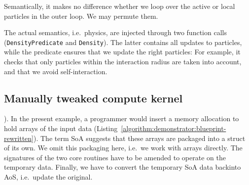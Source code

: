 Semantically, it makes no difference whether we loop over the active or local particles in the outer loop.
We may permute them.


The actual semantics, i.e.~physics, are injected through two function calls (\texttt{DensityPredicate} and \texttt{Density}).
The latter contains all updates to particles, while the predicate ensures that we update the right particles:
For example, it checks that only particles within the interaction radius are taken into account,
and that we avoid self-interaction.





\subsection{Manually tweaked compute kernel}



\cite{Gallard:2020:Roles,Gallard:2020:ExaHyPEVectorisation,Homann:2018:SoAx,Hundt:2006:StructureLayoutOptimisation,Intel:MemoryLayoutTransformations,Jubertie:2018:DataLayoutAbstractionLayers,Reinders:2016:XeonPhi,Springer:2018:SoALayout,Strzodka:2011:AbstractionSoA,Sung:2012:DataLayoutTransformations,Vikram:2014:LLVM,Xu:2014:SemiAutomaticComposition}).
In the present example, a programmer would insert a memory allocation to hold arrays of the input data (Listing~\ref{algorithm:demonstrator:blueprint-rewritten}).
The term SoA suggests that these arrays are packaged into a struct of its own.
We omit this packaging here, i.e.~we work with arrays directly.
The signatures of the two core routines have to be amended to operate on the temporary data.
Finally, we have to convert the temporary SoA data backinto AoS, i.e.~update the original.

